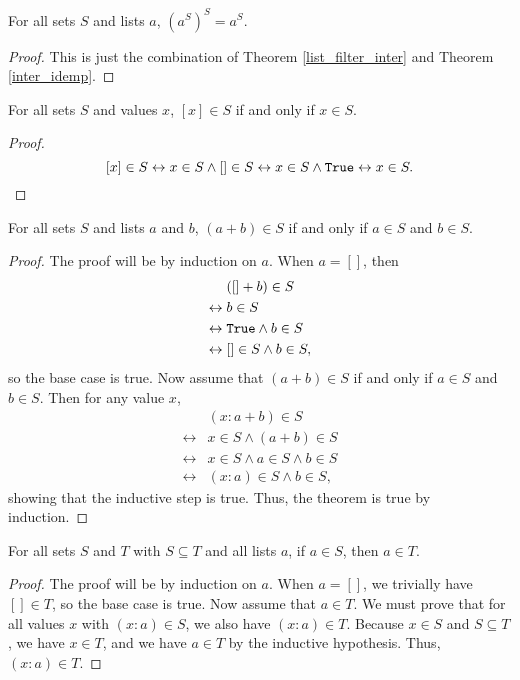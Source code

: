 \documentclass[../math.tex]{subfiles}
\begin{document}
\begin{theorem} \label{list_filter_filter}
    For all sets $S$ and lists $a$, $(a^S)^S = a^S$.
\end{theorem}
\begin{proof}
    This is just the combination of Theorem \ref{list_filter_inter} and Theorem
    \ref{inter_idemp}.
\end{proof}

\begin{theorem}
    For all sets $S$ and values $x$, $[x] \in S$ if and only if $x \in S$.
\end{theorem}
\begin{proof}
    \[
        [x] \in S \leftrightarrow x \in S \wedge [] \in S
        \leftrightarrow x \in S \wedge \vtt{True}
        \leftrightarrow x \in S.
    \]
\end{proof}

\begin{theorem} \label{list_prop_conc}
    For all sets $S$ and lists $a$ and $b$, $(a + b) \in S$ if and only if $a
    \in S$ and $b \in S$.
\end{theorem}
\begin{proof}
    The proof will be by induction on $a$.  When $a = []$, then
    \begin{align*}
        &([] + b) \in S \\
        \leftrightarrow{}&b \in S \\
        \leftrightarrow{}&\vtt{True} \wedge b \in S \\
        \leftrightarrow{}&[] \in S \wedge b \in S,
    \end{align*}
    so the base case is true.  Now assume that $(a + b) \in S$ if and only if $a
    \in S$ and $b \in S$.  Then for any value $x$,
    \begin{align*}
        &(x : a + b) \in S \\
        \leftrightarrow{}&x \in S \wedge (a + b) \in S \\
        \leftrightarrow{}&x \in S \wedge a \in S \wedge b \in S \\
        \leftrightarrow{}&(x : a) \in S \wedge b \in S,
    \end{align*}
    showing that the inductive step is true.  Thus, the theorem is true by
    induction.
\end{proof}

\begin{theorem} \label{list_prop_sub}
    For all sets $S$ and $T$ with $S \subseteq T$ and all lists $a$, if $a \in
    S$, then $a \in T$.
\end{theorem}
\begin{proof}
    The proof will be by induction on $a$.  When $a = []$, we trivially have $[]
    \in T$, so the base case is true.  Now assume that $a \in T$.  We must prove
    that for all values $x$ with $(x : a) \in S$, we also have $(x : a) \in T$.
    Because $x \in S$ and $S \subseteq T$, we have $x \in T$, and we have $a \in
    T$ by the inductive hypothesis.  Thus, $(x : a) \in T$.
\end{proof}
\end{document}
